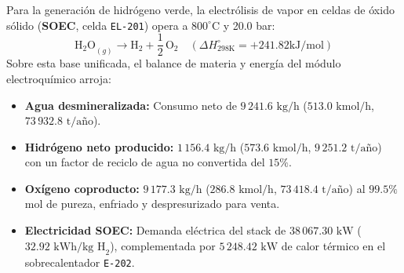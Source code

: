\documentclass[11pt,letterpaper]{article}
\begin{document}
Para la generación de hidrógeno verde, la electrólisis de vapor en celdas de óxido sólido (\textbf{SOEC}, celda \texttt{EL-201}) opera a $800^\circ\mbox{C}$ y 20.0 bar:
\begin{equation}
\mathrm{H_2O}_{(g)} \longrightarrow \mathrm{H_2} + \frac{1}{2}\,\mathrm{O_2} \quad (\Delta H^\circ_{298\mathrm{ K}} = +241.82\mathrm{ kJ/mol})
\end{equation}
Sobre esta base unificada, el balance de materia y energía del módulo electroquímico arroja:
\begin{itemize}
  \item \textbf{Agua desmineralizada:} Consumo neto de $9\,241.6\mbox{ kg/h}$ ($513.0\mbox{ kmol/h}$, $73\,932.8\mbox{ t/año}$).
  \item \textbf{Hidrógeno neto producido:} $1\,156.4\mbox{ kg/h}$ ($573.6\mbox{ kmol/h}$, $9\,251.2\mbox{ t/año}$) con un factor de reciclo de agua no convertida del $15\%$.
  \item \textbf{Oxígeno coproducto:} $9\,177.3\mbox{ kg/h}$ ($286.8\mbox{ kmol/h}$, $73\,418.4\mbox{ t/año}$) al $99.5\%$ mol de pureza, enfriado y despresurizado para venta.
  \item \textbf{Electricidad SOEC:} Demanda eléctrica del stack de $38\,067.30\mbox{ kW}$ ($32.92\mbox{ kWh/kg H}_2$), complementada por $5\,248.42\mbox{ kW}$ de calor térmico en el sobrecalentador \texttt{E-202}.
\end{itemize}
\end{document}
